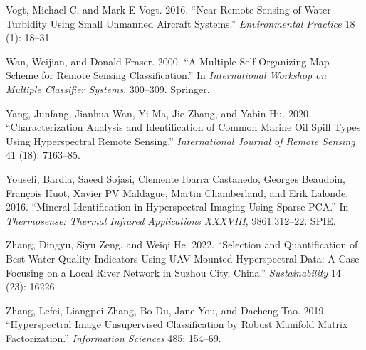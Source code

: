 \documentclass[
  letterpaper,
  DIV=11,
  numbers=noendperiod]{scrartcl}
\newlength{\cslhangindent}
\newenvironment{CSLReferences}[2] %
 {\begin{list}{}{%
  \setlength{\itemindent}{0pt}
  \setlength{\leftmargin}{0pt}
  \setlength{\parsep}{0pt}
  \ifodd #1
   \setlength{\leftmargin}{\cslhangindent}
   \setlength{\itemindent}{-1\cslhangindent}
  \fi
  \setlength{\itemsep}{#2\baselineskip}}}
 {\end{list}}
\begin{document}
\begin{CSLReferences}{1}{0}
Vogt, Michael C, and Mark E Vogt. 2016. {``Near-Remote Sensing of Water
Turbidity Using Small Unmanned Aircraft Systems.''} \emph{Environmental
Practice} 18 (1): 18--31.

Wan, Weijian, and Donald Fraser. 2000. {``A Multiple Self-Organizing Map
Scheme for Remote Sensing Classification.''} In \emph{International
Workshop on Multiple Classifier Systems}, 300--309. Springer.

Yang, Junfang, Jianhua Wan, Yi Ma, Jie Zhang, and Yabin Hu. 2020.
{``Characterization Analysis and Identification of Common Marine Oil
Spill Types Using Hyperspectral Remote Sensing.''} \emph{International
Journal of Remote Sensing} 41 (18): 7163--85.

Yousefi, Bardia, Saeed Sojasi, Clemente Ibarra Castanedo, Georges
Beaudoin, François Huot, Xavier PV Maldague, Martin Chamberland, and
Erik Lalonde. 2016. {``Mineral Identification in Hyperspectral Imaging
Using Sparse-PCA.''} In \emph{Thermosense: Thermal Infrared Applications
XXXVIII}, 9861:312--22. SPIE.

Zhang, Dingyu, Siyu Zeng, and Weiqi He. 2022. {``Selection and
Quantification of Best Water Quality Indicators Using UAV-Mounted
Hyperspectral Data: A Case Focusing on a Local River Network in Suzhou
City, China.''} \emph{Sustainability} 14 (23): 16226.

Zhang, Lefei, Liangpei Zhang, Bo Du, Jane You, and Dacheng Tao. 2019.
{``Hyperspectral Image Unsupervised Classification by Robust Manifold
Matrix Factorization.''} \emph{Information Sciences} 485: 154--69.

\end{CSLReferences}
\end{document}
